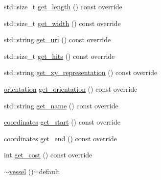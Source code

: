 \begin{DoxyCompactItemize}
std\+::size\+\_\+t \hyperlink{classbattle__ship_1_1vessel_a96d84d8ad107db77ae601d4e29471dde}{get\+\_\+length} () const override
\item 
std\+::size\+\_\+t \hyperlink{classbattle__ship_1_1vessel_a625d8f457a7afdafea7422ad89648123}{get\+\_\+width} () const override
\item 
std\+::string \hyperlink{classbattle__ship_1_1vessel_a3ab0850a3ccedf7e6083c7b494284289}{get\+\_\+uri} () const override
\item 
std\+::size\+\_\+t \hyperlink{classbattle__ship_1_1vessel_a1d7fb8fe8e4454850c1cd7dbb4c70d49}{get\+\_\+hits} () const override
\item 
std\+::string \hyperlink{classbattle__ship_1_1vessel_a84bfaba9be4f15f6ec934c925d11967d}{get\+\_\+xy\+\_\+representation} () const override
\item 
\hyperlink{namespacebattle__ship_aed87488f0a73f0d0679fe343fb61c784}{orientation} \hyperlink{classbattle__ship_1_1vessel_a698c7811878e56b7ba7eb6d88e6ac13f}{get\+\_\+orientation} () const override
\item 
std\+::string \hyperlink{classbattle__ship_1_1vessel_a623a1b35355db117b5381a3a0f5774eb}{get\+\_\+name} () const override
\item 
\hyperlink{structbattle__ship_1_1coordinates}{coordinates} \hyperlink{classbattle__ship_1_1vessel_aba133e1debe50caa9cbbae5e867b5995}{get\+\_\+start} () const override
\item 
\hyperlink{structbattle__ship_1_1coordinates}{coordinates} \hyperlink{classbattle__ship_1_1vessel_ab24ee1fe21632b510833c8369ef3560a}{get\+\_\+end} () const override
\item 
int \hyperlink{classbattle__ship_1_1vessel_aadca1fe2ac265ed9f22e68490b6b22eb}{get\+\_\+cost} () const override
\item 
\hyperlink{classbattle__ship_1_1vessel_a281821b204a7fb93071ef75de5685a37}{$\sim$vessel} ()=default
\end{DoxyCompactItemize}
